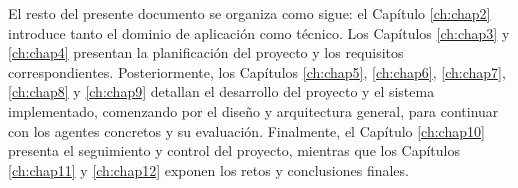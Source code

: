 El resto del presente documento se organiza como sigue: el Capítulo \ref{ch:chap2} introduce tanto el dominio de aplicación como técnico. Los Capítulos \ref{ch:chap3} y \ref{ch:chap4} presentan la planificación del proyecto y los requisitos correspondientes. Posteriormente, los Capítulos \ref{ch:chap5}, \ref{ch:chap6}, \ref{ch:chap7}, \ref{ch:chap8} y \ref{ch:chap9} detallan el desarrollo del proyecto y el sistema implementado, comenzando por el diseño y arquitectura general, para continuar con los agentes concretos y su evaluación. Finalmente, el Capítulo \ref{ch:chap10} presenta el seguimiento y control del proyecto, mientras que los Capítulos \ref{ch:chap11} y \ref{ch:chap12} exponen los retos y conclusiones finales.
